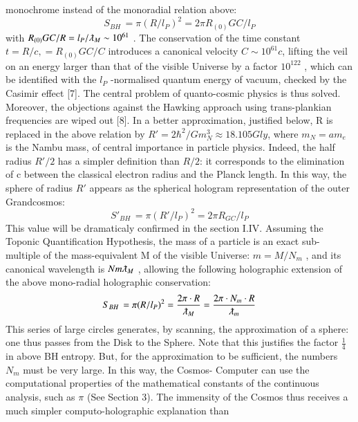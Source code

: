 \documentclass[twoside,draft]{article}
\begin{document}
\begin{sloppypar}
{monochrome instead of the monoradial relation above:
\begin{equation}
S_{BH}\, = \pi(R/l_P )^{2} = 2\pi R_{(0)} GC /l_{P}
\end{equation}
with $R_{(0)} GC /R = l_{P} /\lambdabar_{M} \sim 10^{61}$ . The conservation of the time constant $t = R/c, = R_{(0)} GC /C$ introduces a canonical velocity $C \sim 10^{61} c$, lifting the veil on an energy larger than that of the visible Universe by a
factor $10^{122}$ , which can be identified with the $l_{P}$ -normalised quantum energy of vacuum, checked by
the Casimir effect [7]. The central problem of quanto-cosmic physics is thus solved. Moreover, the
objections against the Hawking approach using trans-plankian frequencies are wiped out [8].
In a better approximation, justified below, R is replaced in the above relation by $R\prime = 2\hbar^{2}/Gm_{N}^{3}
\approx 18.105 Gly$, where $m_{N} = am_{e}$ is the Nambu mass, of central importance in particle
physics. Indeed, the half radius $R\prime/2$ has a simpler definition than $R/2$: it corresponds to the
elimination of c between the classical electron radius and the Planck length. In this way, the sphere
of radius $R\prime$ appears as the spherical hologram representation of the outer Grandcosmos:
\begin{equation}
S\prime_{BH}\, = \pi(R\prime/l_{P})^{2} = 2\pi R_{GC} /l_{P}
\end{equation}
This value will be dramaticaly confirmed in the section I.IV.
Assuming the Toponic Quantification Hypothesis, the mass of a particle is an exact sub-multiple
of the mass-equivalent M of the visible Universe: $m = M/N_{m}$ , and its canonical wavelength is $N m \lambdabar_{M}$ ,
allowing the following holographic extension of the above mono-radial holographic conservation:
\begin{equation}
S_{BH}\, = \pi(R/l_{P})^{2} = \frac{2\pi \cdot R}{\lambdabar_{M}} = \frac{2\pi \cdot N_{m} \cdot R}{\lambdabar_{m}}
\end{equation}
This series of large circles generates, by scanning, the approximation of a sphere: one thus passes
from the Disk to the Sphere. Note that this justifies the factor $\frac{1}{4}$ in above BH entropy. But, for
the approximation to be sufficient, the numbers $N_{m}$ must be very large. In this way, the Cosmos-
Computer can use the computational properties of the mathematical constants of the continuous
analysis, such as $\pi$ (See Section 3).
The immensity of the Cosmos thus receives a much simpler computo-holographic explanation than
}
\end{sloppypar}
\end{document}
